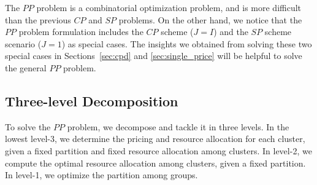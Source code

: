 \documentclass[twocolumn,10pt,twosided]{IEEEtran}
\begin{document}
The $PP$ problem is a combinatorial optimization problem, and is more difficult than  the previous $CP$ and $SP$ problems.
On the other hand, we notice that the $PP$ problem formulation includes the $CP$ scheme ($J=I$) and the $SP$ scheme scenario ($J=1$) as special cases. The insights we obtained from solving these two special cases in Sections~\ref{sec:cpd} and \ref{sec:single_price} will be helpful to solve the general $PP$ problem.

\subsection{Three-level Decomposition}
To solve the $PP$ problem, we decompose and tackle it in three levels. In the lowest level-3, we determine the pricing and resource allocation for each cluster, given a fixed partition and fixed resource allocation among clusters. In level-2, we compute the optimal resource allocation among clusters, given a fixed partition. In level-1, we optimize the partition among groups.
\end{document}
